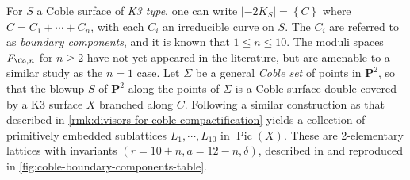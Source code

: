 \documentclass{amsart}
\begin{document}
\begin{remark}

For \(S\) a Coble surface of \emph{K3 type}, one can write \({\left\lvert {-2K_S} \right\rvert} = \left\{{C}\right\}\) where \(C = C_1 + \cdots + C_n\), with each \(C_i\) an irreducible curve on \(S\). The \(C_i\) are referred to as \emph{boundary components}, and it is known that \(1\leq n \leq 10\). The moduli spaces \(F_{\Co, n}\) for \(n\geq 2\) have not yet appeared in the literature, but are amenable to a similar study as the \(n=1\) case. Let \(\Sigma\) be a general \emph{Coble set} of points in \({\mathbf{P}}^2\), so that the blowup \(S\) of \({\mathbf{P}}^2\) along the points of \(\Sigma\) is a Coble surface double covered by a K3 surface \(X\) branched along \(C\). Following a similar construction as that described in \cref{rmk:divisors-for-coble-compactification} yields a collection of primitively embedded sublattices \(L_1,\cdots, L_{10}\) in \(\operatorname{Pic}(X)\). These are 2-elementary lattices with invariants \((r=10+n, a=12-n,\delta)\), described in \cite[Table 5.1, p.553]{EnriquesOne} and reproduced in \cref{fig:coble-boundary-components-table}.


\end{remark}
\end{document}
